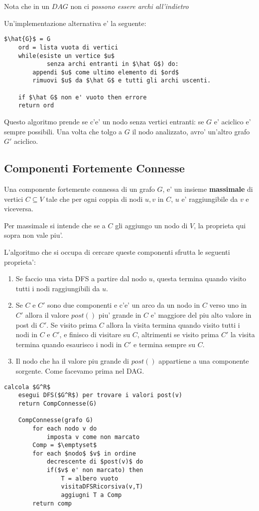 Nota che in un $DAG$ non ci \textit{possono essere archi all'indietro} 

Un'implementazione alternativa e' la seguente:
\begin{lstlisting}[mathescape=true]
    $\hat{G}$ = G
    ord = lista vuota di vertici
    while(esiste un vertice $u$ 
            senza archi entranti in $\hat G$) do:
        appendi $u$ come ultimo elemento di $ord$
        rimuovi $u$ da $\hat G$ e tutti gli archi uscenti.
    
    if $\hat G$ non e' vuoto then errore
    return ord
\end{lstlisting}

Questo algoritmo prende se c'e' un nodo senza vertici entranti: se $G$ e' aciclico e' sempre 
possibili. Una volta che tolgo a $G$ il nodo analizzato, avro' un'altro grafo $G'$ aciclico.

\subsection{Componenti Fortemente Connesse}
Una componente fortemente connessa di un grafo $G$, e' un insieme \textbf{massimale} di vertici
$C \subseteq V$ tale che per ogni coppia di nodi $u,v$ in $C$, $u$ e' raggiungibile da $v$
e viceversa.

Per massimale si intende che se a $C$ gli aggiungo un nodo di $V$, la proprieta qui sopra non vale piu'.

L'algoritmo che si occupa di cercare queste componenti sfrutta le seguenti proprieta':
\begin{enumerate}
    \item Se faccio una vista DFS a partire dal nodo $u$, questa termina quando visito tutti i nodi raggiungibili da $u$.
    \item Se $C$ e $C'$ sono due componenti e c'e' un arco da un nodo in $C$ verso uno in $C'$ allora il valore $post()$ piu' grande in $C$
    e' maggiore del piu alto valore in post di $C'$. Se visito prima $C$ allora la visita termina quando visito tutti i nodi in $C$ e $C'$, e finisco di visitare su $C$, altrimenti
    se visito prima $C'$ la visita termina quando esaurisco i nodi in $C'$ e termina sempre su $C$.
    \item Il nodo che ha il valore piu grande di $post()$ appartiene a una componente sorgente. Come facevamo prima nel DAG.
\end{enumerate}

\begin{lstlisting}[mathescape=true]
    calcola $G^R$
    esegui DFS($G^R$) per trovare i valori post(v)
    return CompConnesse(G)

    CompConnesse(grafo G)
        for each nodo v do 
            imposta v come non marcato
        Comp = $\emptyset$
        for each $nodo$ $v$ in ordine
            decrescente di $post(v)$ do
            if($v$ e' non marcato) then
                T = albero vuoto
                visitaDFSRicorsiva(v,T)
                aggiugni T a Comp
        return comp
\end{lstlisting}